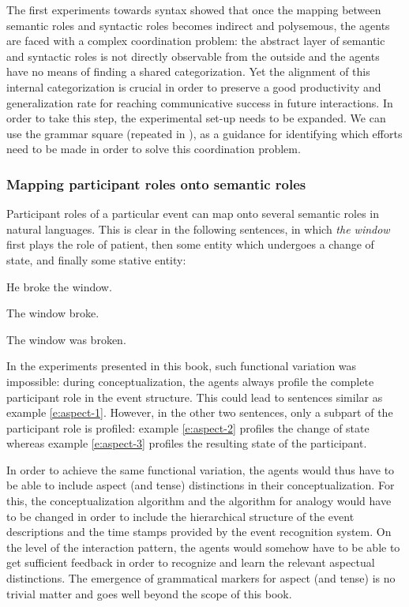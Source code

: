 The first experiments towards syntax showed that once the mapping between semantic roles and syntactic roles becomes indirect and polysemous, the agents are faced with a complex coordination problem: the abstract layer of semantic and syntactic roles is not directly observable from the outside and the agents have no means of finding a shared categorization. Yet the alignment of this internal categorization is crucial in order to preserve a good productivity and generalization rate for reaching communicative success in future interactions. In order to take this step, the experimental set-up needs to be expanded. We can use the grammar square (repeated in ), as a guidance for identifying which efforts need to be made in order to solve this coordination problem.


\subsubsection{Mapping participant roles onto semantic roles}
 Participant roles of a particular event can map onto several semantic roles in natural languages. This is clear in the following sentences, in which {\em the window} first plays the role of patient, then some entity which undergoes a change of state, and finally some stative entity:

\ea
He broke the window.
\label{e:aspect-1}
\item The window broke.
\label{e:aspect-2}
\item The window was broken.
\label{e:aspect-3}
\z

In the experiments presented in this book, such functional variation was impossible: during conceptualization, the agents always profile the complete participant role in the event structure. This could lead to sentences similar as example \ref{e:aspect-1}. However, in the other two sentences, only a subpart of the participant role is profiled: example \ref{e:aspect-2} profiles the change of state whereas example \ref{e:aspect-3} profiles the resulting state of the participant.

In order to achieve the same functional variation, the agents would thus have to be able to include aspect (and tense) distinctions in their conceptualization. For this, the conceptualization algorithm and the algorithm for analogy would have to be changed in order to include the hierarchical structure of the event descriptions and the time stamps provided by the event recognition system. On the level of the interaction pattern, the agents would somehow have to be able to get sufficient feedback in order to recognize and learn the relevant aspectual distinctions. The emergence of grammatical markers for aspect (and tense) is no trivial matter and goes well beyond the scope of this book.


